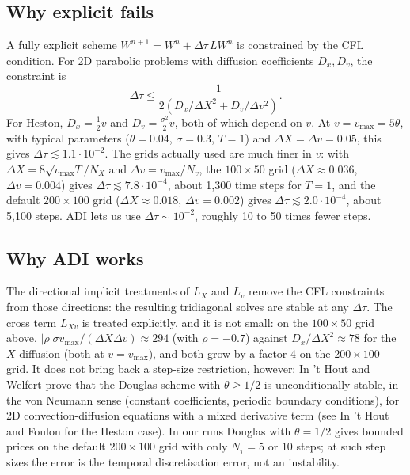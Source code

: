 \documentclass[11pt]{article}
\theoremstyle{plain}
\theoremstyle{definition}
\theoremstyle{remark}
\begin{document}
\subsection{Why explicit fails}

A fully explicit scheme $W^{n+1} = W^n + \Delta\tau\, L W^n$ is constrained by the CFL condition. For 2D parabolic problems with diffusion coefficients $D_x, D_v$, the constraint is
\[
    \Delta\tau \leq \frac{1}{2(D_x / \Delta X^2 + D_v / \Delta v^2)}.
\]
For Heston, $D_x = \tfrac12 v$ and $D_v = \tfrac{\sigma^2}{2} v$, both of which depend on $v$. At $v = v_{\max} = 5\theta$, with typical parameters ($\theta = 0.04$, $\sigma = 0.3$, $T = 1$) and $\Delta X = \Delta v = 0.05$, this gives $\Delta\tau \lesssim 1.1 \cdot 10^{-2}$. The grids actually used are much finer in $v$: with $\Delta X = 8\sqrt{v_{\max} T} / N_X$ and $\Delta v = v_{\max} / N_v$, the $100 \times 50$ grid ($\Delta X \approx 0.036$, $\Delta v = 0.004$) gives $\Delta\tau \lesssim 7.8 \cdot 10^{-4}$, about 1{,}300 time steps for $T = 1$, and the default $200 \times 100$ grid ($\Delta X \approx 0.018$, $\Delta v = 0.002$) gives $\Delta\tau \lesssim 2.0 \cdot 10^{-4}$, about 5{,}100 steps. ADI lets us use $\Delta\tau \sim 10^{-2}$, roughly 10 to 50 times fewer steps.

\subsection{Why ADI works}

The directional implicit treatments of $L_X$ and $L_v$ remove the CFL constraints from those directions: the resulting tridiagonal solves are stable at any $\Delta\tau$. The cross term $L_{Xv}$ is treated explicitly, and it is not small: on the $100 \times 50$ grid above, $|\rho|\sigma v_{\max} / (\Delta X \Delta v) \approx 294$ (with $\rho = -0.7$) against $D_x / \Delta X^2 \approx 78$ for the $X$-diffusion (both at $v = v_{\max}$), and both grow by a factor 4 on the $200 \times 100$ grid. It does not bring back a step-size restriction, however: In 't Hout and Welfert \cite{InHoutWelfert2007} prove that the Douglas scheme with $\theta \ge 1/2$ is unconditionally stable, in the von Neumann sense (constant coefficients, periodic boundary conditions), for 2D convection-diffusion equations with a mixed derivative term (see In 't Hout and Foulon \cite{InHoutFoulon2010} for the Heston case). In our runs Douglas with $\theta = 1/2$ gives bounded prices on the default $200 \times 100$ grid with only $N_\tau = 5$ or $10$ steps; at such step sizes the error is the temporal discretisation error, not an instability.
\end{document}
